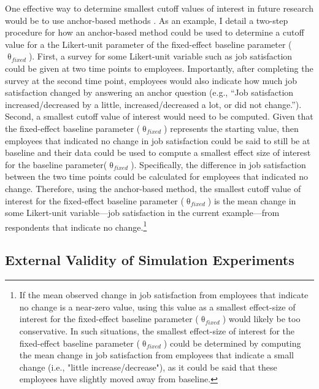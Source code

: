 \documentclass[
12pt, %
twoside,
english]{guelphthesis}
\begin{document}
One effective way to determine smallest cutoff values of interest in future research would be to use anchor-based methods \autocite{anvari2021}. As an example, I detail a two-step procedure for how an anchor-based method could be used to determine a cutoff value for a the Likert-unit parameter of the fixed-effect baseline parameter (\(\uptheta_{fixed}\)). First, a survey for some Likert-unit variable such as job satisfaction could be given at two time points to employees. Importantly, after completing the survey at the second time point, employees would also indicate how much job satisfaction changed by answering an anchor question (e.g., ``Job satisfaction increased/decreased by a little, increased/decreased a lot, or did not change.''). Second, a smallest cutoff value of interest would need to be computed. Given that the fixed-effect baseline parameter (\(\uptheta_{fixed}\)) represents the starting value, then employees that indicated no change in job satisfaction could be said to still be at baseline and their data could be used to compute a smallest effect size of interest for the baseline parameter(\(\uptheta_{fixed}\)). Specifically, the difference in job satisfaction between the two time points could be calculated for employees that indicated no change. Therefore, using the anchor-based method, the smallest cutoff value of interest for the fixed-effect baseline parameter (\(\uptheta_{fixed}\)) is the mean change in some Likert-unit variable---job satisfaction in the current example---from respondents that indicate no change.\footnote{If the mean observed change in job satisfaction from employees that indicate no change is a near-zero value, using this value as a smallest effect-size of interest for the fixed-effect baseline parameter ($\uptheta_{fixed}$) would likely be too conservative. In such situations, the smallest effect-size of interest for the fixed-effect baseline parameter ($\uptheta_{fixed}$) could be determined by computing the mean change in job satisfaction from employees that indicate a small change (i.e., "little increase/decrease"), as it could be said that these employees have slightly moved away from baseline.}

\hypertarget{external-validity-of-simulation-experiments}{%
\subsection{External Validity of Simulation Experiments}\label{external-validity-of-simulation-experiments}}
\end{document}
